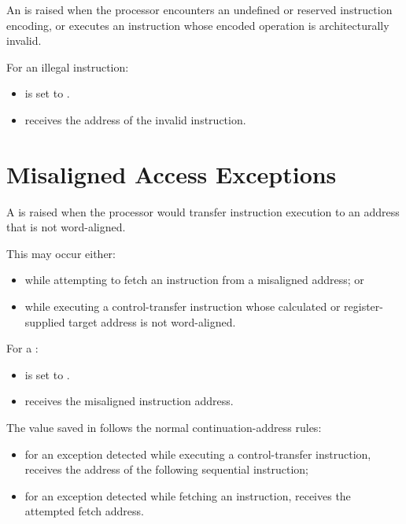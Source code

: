An  is raised when the processor encounters an undefined
or reserved instruction encoding, or executes an instruction whose encoded
operation is architecturally invalid.

For an illegal instruction:

\begin{itemize}
\item {} is set to .
\item {} receives the address of the invalid instruction.
\end{itemize}

\section{Misaligned Access Exceptions}

A  is raised when the processor would transfer instruction
execution to an address that is not word-aligned.

This may occur either:

\begin{itemize}
\item while attempting to fetch an instruction from a misaligned address; or
\item while executing a control-transfer instruction whose calculated or register-supplied
target address is not word-aligned.
\end{itemize}

For a :

\begin{itemize}
\item {} is set to .
\item {} receives the misaligned instruction address.
\end{itemize}

The value saved in  follows the normal continuation-address rules:

\begin{itemize}
\item for an exception detected while executing a control-transfer instruction,
 receives the address of the following sequential instruction;
\item for an exception detected while fetching an instruction,
 receives the attempted fetch address.
\end{itemize}

